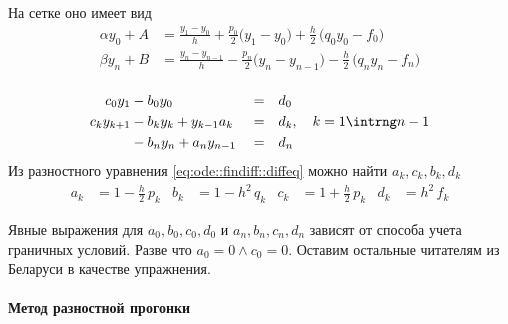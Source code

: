 \documentclass{trlnotes}
\begin{document}
\begin{enumerate}
        На сетке оно имеет вид
        \begin{equation*}
          \begin{split}
            α y_0 + A &= \frac{y_1 - y_{0}}{h} + \frac{p_0}{2} \biggl(y_1 - y_{0}\biggr)
            + \frac{h}{2}\,\biggl(q_0 y_0 - f_0\biggr) \\
            β y_n + B &= \frac{y_n - y_{n-1}}{h} - \frac{p_n}{2} \biggl(y_n - y_{n-1}\biggr)
            - \frac{h}{2}\,\biggl(q_n y_n - f_n\biggr) \\
            \end{split}
        \end{equation*}
\end{enumerate}

\begin{equation}\label{eq:ode::findiff::tdma}
  \begin{aligned}
    c_0 y_1     &- b_0 y_0                  &&=& &d_0 \\
    c_k y_{k+1} &- b_k y_k+ y_{k-1} a_k     &&=& &d_k,\quad k= 1\intrng n-1 \\
                &- b_n y_n + a_n y_{n-1}    &&=& &d_n 
  \end{aligned}
\end{equation}
Из разностного уравнения \eqref{eq:ode::findiff::diffeq} можно найти $a_k, c_k, b_k, d_k$
\[
  \begin{aligned}
    a_k &= 1- \tfrac{h}2 \, p_k &
    b_k &= 1- h^2 \, q_k &
    c_k &= 1+ \tfrac{h}2 \, p_k &
    d_k &= {h}^2 \, f_k 
  \end{aligned}
\]

Явные выражения для $a_0, b_0, c_0, d_0$ и $a_n, b_n, c_n, d_n$
зависят от способа учета граничных условий. Разве что $a_0 = 0\land c_0 = 0$.
Оставим остальные читателям из Беларуси в качестве упражнения.

\paragraph{Метод разностной прогонки}
\label{par:ode::fintdma}
\end{document}
